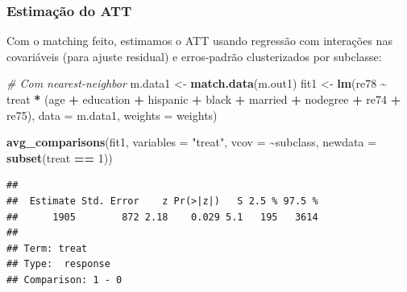 \documentclass[
]{article}
\newenvironment{Shaded}{\begin{snugshade}}{\end{snugshade}}
\newcommand{\AttributeTok}[1]{\textcolor[rgb]{0.13,0.29,0.53}{#1}}
\newcommand{\CommentTok}[1]{\textcolor[rgb]{0.56,0.35,0.01}{\textit{#1}}}
\newcommand{\DecValTok}[1]{\textcolor[rgb]{0.00,0.00,0.81}{#1}}
\newcommand{\FunctionTok}[1]{\textcolor[rgb]{0.13,0.29,0.53}{\textbf{#1}}}
\newcommand{\NormalTok}[1]{#1}
\newcommand{\OtherTok}[1]{\textcolor[rgb]{0.56,0.35,0.01}{#1}}
\newcommand{\SpecialCharTok}[1]{\textcolor[rgb]{0.81,0.36,0.00}{\textbf{#1}}}
\newcommand{\StringTok}[1]{\textcolor[rgb]{0.31,0.60,0.02}{#1}}
\begin{document}
\subsubsection{Estimação do ATT}\label{estimauxe7uxe3o-do-att}

Com o matching feito, estimamos o ATT usando regressão com interações nas covariáveis (para ajuste residual) e erros-padrão clusterizados por subclasse:

\begin{Shaded}
\begin{Highlighting}[]
\CommentTok{\# Com nearest{-}neighbor}
\NormalTok{m.data1 }\OtherTok{\textless{}{-}} \FunctionTok{match.data}\NormalTok{(m.out1)}
\NormalTok{fit1 }\OtherTok{\textless{}{-}} \FunctionTok{lm}\NormalTok{(re78 }\SpecialCharTok{\textasciitilde{}}\NormalTok{ treat }\SpecialCharTok{*}\NormalTok{ (age }\SpecialCharTok{+}\NormalTok{ education }\SpecialCharTok{+}\NormalTok{ hispanic }\SpecialCharTok{+}\NormalTok{ black }\SpecialCharTok{+}\NormalTok{ married }\SpecialCharTok{+}
\NormalTok{                             nodegree }\SpecialCharTok{+}\NormalTok{ re74 }\SpecialCharTok{+}\NormalTok{ re75),}
           \AttributeTok{data =}\NormalTok{ m.data1, }\AttributeTok{weights =}\NormalTok{ weights)}

\FunctionTok{avg\_comparisons}\NormalTok{(fit1, }\AttributeTok{variables =} \StringTok{"treat"}\NormalTok{,}
                \AttributeTok{vcov =} \SpecialCharTok{\textasciitilde{}}\NormalTok{subclass, }\AttributeTok{newdata =} \FunctionTok{subset}\NormalTok{(treat }\SpecialCharTok{==} \DecValTok{1}\NormalTok{))}
\end{Highlighting}
\end{Shaded}

\begin{verbatim}
## 
##  Estimate Std. Error    z Pr(>|z|)   S 2.5 % 97.5 %
##      1905        872 2.18    0.029 5.1   195   3614
## 
## Term: treat
## Type:  response 
## Comparison: 1 - 0
\end{verbatim}
\end{document}
